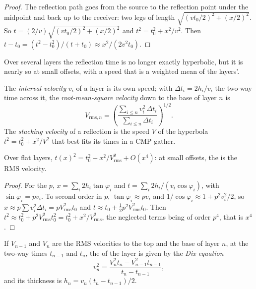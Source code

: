 \begin{proof}
The reflection path goes from the source to the reflection point under the
midpoint and back up to the receiver: two legs of length
$\sqrt{(vt_0/2)^2 + (x/2)^2}$. So $t = (2/v)\sqrt{(vt_0/2)^2 + (x/2)^2}$ and
$t^2 = t_0^2 + x^2/v^2$. Then $t - t_0 = (t^2 - t_0^2)/(t + t_0) \approx
x^2/(2v^2t_0)$.
\end{proof}

Over several layers the reflection time is no longer exactly hyperbolic, but it
is nearly so at small offsets, with a speed that is a weighted mean of the
layers'.

\begin{definition}\label{def:b3:exploration-seismology:velocities}
The \emph{interval velocity} $v_i$ of a layer is its
own speed; with $\Delta t_i = 2h_i/v_i$ the two-way time across it, the
\emph{root-mean-square velocity} down to the
base of layer $n$ is
\[
  V_{\text{rms},n} = \left(\frac{\sum_{i\le n}v_i^2\,\Delta t_i}{\sum_{i\le n}\Delta t_i}\right)^{1/2}.
\]
The \emph{stacking velocity} of a reflection is the
speed $V$ of the hyperbola $t^2 = t_0^2 + x^2/V^2$ that best fits its times in a
CMP gather.
\end{definition}

\begin{proposition}\label{prop:b3:exploration-seismology:rms}
Over flat layers, $t(x)^2 = t_0^2 + x^2/V_{\text{rms}}^2 + O(x^4)$: at small
offsets, the  is the RMS velocity.
\end{proposition}

\begin{proof}
For the  $p$, $x = \sum_i 2h_i\tan\varphi_i$ and
$t = \sum_i 2h_i/(v_i\cos\varphi_i)$, with $\sin\varphi_i = pv_i$. To second
order in $p$, $\tan\varphi_i \approx pv_i$ and $1/\cos\varphi_i \approx 1 +
p^2v_i^2/2$, so $x \approx p\sum v_i^2\Delta t_i = pV_{\text{rms}}^2t_0$ and
$t \approx t_0 + \tfrac12p^2V_{\text{rms}}^2t_0$. Then
$t^2 \approx t_0^2 + p^2V_{\text{rms}}^2t_0^2 = t_0^2 + x^2/V_{\text{rms}}^2$, the
neglected terms being of order $p^4$, that is $x^4$.
\end{proof}

\begin{theorem}\label{thm:b3:exploration-seismology:dix}
If $V_{n-1}$ and $V_n$ are the RMS velocities to the top and the base of layer
$n$, at the two-way times $t_{n-1}$ and $t_n$, the  of the
layer is given by the \emph{Dix equation}
\[
  v_n^2 = \frac{V_n^2t_n - V_{n-1}^2t_{n-1}}{t_n - t_{n-1}} ,
\]
and its thickness is $h_n = v_n(t_n - t_{n-1})/2$.
\end{theorem}

